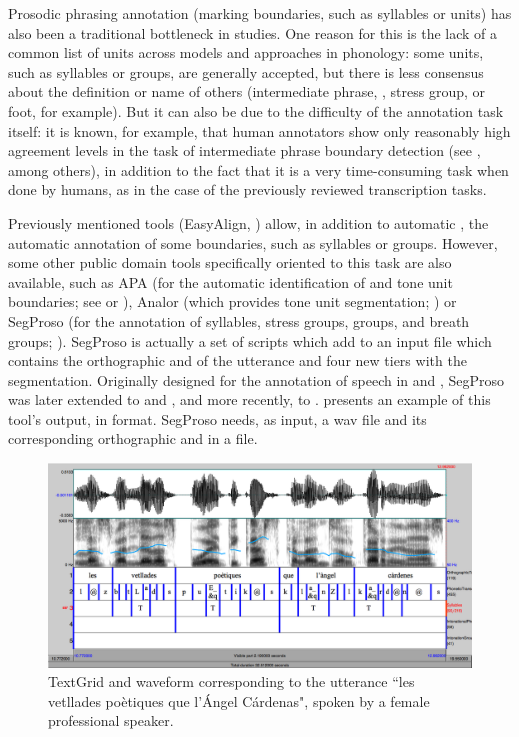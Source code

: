 \documentclass[output=paper]{langsci/langscibook}
\begin{document}
Prosodic phrasing annotation (marking  boundaries, such as syllables or  units) has also been a traditional bottleneck in  studies. One reason for this is the lack of a common list of  units across models and approaches in  phonology: some units, such as syllables or  groups, are generally accepted, but there is less consensus about the definition or name of others (intermediate phrase, , stress group, or foot, for example). But it can also be due to the difficulty of the annotation task itself: it is known, for example, that human annotators show only reasonably high agreement levels in the task of intermediate phrase boundary detection (see \citealt{Syrdal2000}, among others), in addition to the fact that it is a very time-consuming task when done by humans, as in the case of the previously reviewed transcription tasks.

Previously mentioned tools (EasyAlign, ) allow, in addition to automatic , the automatic annotation of some  boundaries, such as syllables or  groups. However, some other public domain tools specifically oriented to this task are also available, such as APA (for the automatic identification of  and tone unit boundaries; see \citealt{Cutugno2002} or \citealt{Petrillo2004}), Analor (which provides tone unit segmentation; \citealt{Avanzi2008}) or SegProso (for the annotation of syllables, stress groups,  groups, and breath groups; \citealt{Garrido2013SegProso}). SegProso is actually a set of  scripts which add to an input  file which contains the orthographic and  of the utterance and four new tiers with the  segmentation. Originally designed for the annotation of speech in  and , SegProso was later extended to  and  , and more recently, to .  presents an example of this tool’s output, in   format. SegProso needs, as input, a wav file and its corresponding orthographic and  in a  file.

\begin{figure}
\includegraphics[width=\textwidth]{figures/GAR-img002.png}
\caption{TextGrid and waveform corresponding to the utterance ``les vetllades poètiques que l’Ángel Cárdenas", spoken by a female professional speaker.}
\label{fig:gar:2}
\end{figure}
\end{document}
